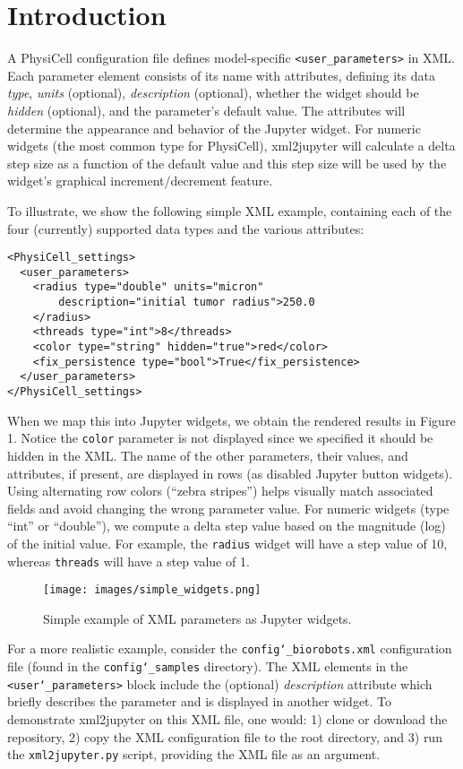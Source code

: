 \documentclass[10pt,letterpaper]{article}
\begin{document}
\section*{Introduction}
A PhysiCell configuration file defines model-specific
\texttt{\textless{}user\_parameters\textgreater{}} in XML. Each
parameter element consists of its name with attributes, defining its
data \emph{type}, \emph{units} (optional), \emph{description}
(optional), whether the widget should be \emph{hidden} (optional), and
the parameter's default value. The attributes will determine the
appearance and behavior of the Jupyter widget. For numeric widgets (the
most common type for PhysiCell), xml2jupyter will calculate a delta step
size as a function of the default value and this step size will be used
by the widget's graphical increment/decrement feature.

To illustrate, we show the following simple XML example, containing each
of the four (currently) supported data types and the various attributes:

\begin{verbatim}
<PhysiCell_settings>
  <user_parameters>
    <radius type="double" units="micron"
        description="initial tumor radius">250.0
    </radius>
    <threads type="int">8</threads>
    <color type="string" hidden="true">red</color>
    <fix_persistence type="bool">True</fix_persistence>
  </user_parameters>
</PhysiCell_settings>
\end{verbatim}

When we map this into Jupyter widgets, we obtain the rendered results in
Figure 1. Notice the \texttt{color} parameter is not displayed since we
specified it should be hidden in the XML. The name of the other
parameters, their values, and attributes, if present, are displayed in
rows (as disabled Jupyter button widgets). Using alternating row colors
(``zebra stripes'') helps visually match associated fields and avoid
changing the wrong parameter value. For numeric widgets (type ``int'' or
``double''), we compute a delta step value based on the magnitude (log)
of the initial value. For example, the \texttt{radius} widget will have
a step value of 10, whereas \texttt{threads} will have a step value of
1.

\begin{figure}[H]
\centering
\texttt{[image: images/simple\_widgets.png]}
\caption{Simple example of XML parameters as Jupyter widgets.}
\end{figure}

For a more realistic example, consider the
\texttt{config\char`_biorobots.xml} configuration file (found in the
\texttt{config\char`_samples} directory). The XML elements in the
\texttt{\textless{}user\char`_parameters\textgreater{}} block include the
(optional) \emph{description} attribute which briefly describes the
parameter and is displayed in another widget. To demonstrate xml2jupyter
on this XML file, one would: 1) clone or download the repository, 2)
copy the XML configuration file to the root directory, and 3) run the
\texttt{xml2jupyter.py} script, providing the XML file as an argument.
\end{document}
